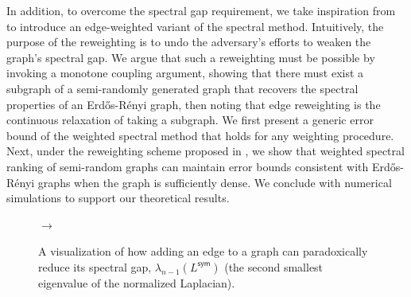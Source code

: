 \documentclass[sigconf,nonacm,pbalance]{acmart}
\begin{document}
In addition, to overcome the spectral gap requirement, we 
take inspiration from \cite{MonotoneAdversary} to 
introduce an edge-weighted variant of the spectral method. Intuitively, the purpose of the reweighting is to undo the adversary's efforts to weaken the graph's spectral gap. We argue that such a reweighting must be possible by invoking a monotone coupling argument, showing that there must exist a subgraph of a semi-randomly generated graph that recovers the spectral properties of an Erd\H{o}s-R\'{e}nyi graph, then noting that edge reweighting is the continuous relaxation of taking a subgraph. We first present a generic error bound of the weighted spectral method that holds for any weighting procedure. Next, under the reweighting scheme proposed in \cite{MonotoneAdversary}, we show that weighted spectral ranking of semi-random graphs can maintain error bounds consistent with Erd\H{o}s-R\'{e}nyi graphs when the graph is sufficiently dense. We conclude with numerical simulations to support our theoretical results.

\begin{figure}[t]
    \centering
    
    \hspace{1em} $\to$ \hspace{1em}
    \caption{A visualization of how adding an edge to a graph can paradoxically reduce its spectral gap, $\lambda_{n-1}(L^{\mathsf{sym}})$ (the second smallest eigenvalue of the normalized Laplacian).}
    \label{fig:paradox}
\end{figure}
\end{document}
